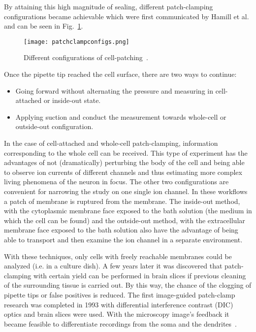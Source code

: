 \documentclass[12pt,a4paper]{report}
\begin{document}
By attaining this high magnitude of sealing, different patch-clamping configurations became achievable which were first communicated by Hamill et al. and can be seen in Fig.~\ref{fig:pcconfigs}.
\begin{figure}
    \centering
    \texttt{[image: patchclampconfigs.png]}
    \caption{Different configurations of cell-patching~\cite{hamill1981}.}
    \label{fig:pcconfigs}
\end{figure}
Once the pipette tip reached the cell surface, there are two ways to continue:
\begin{itemize}
    \item Going forward without alternating the pressure and measuring in cell-attached or inside-out state.
    \item Applying suction and conduct the measurement towards whole-cell or outside-out configuration.
\end{itemize}
In the case of cell-attached and whole-cell patch-clamping, information corresponding to the whole cell can be received. This type of experiment has the advantages of not (dramatically) perturbing the body of the cell and being able to observe ion currents of different channels and thus estimating more complex living phenomena of the neuron in focus. The other two configurations are convenient for narrowing the study on one single ion channel. In these workflows a patch of membrane is ruptured from the membrane. The inside-out method, with the cytoplasmic membrane face exposed to the bath solution (the medium in which the cell can be found) and the outside-out method, with the extracellular membrane face exposed to the bath solution also have the advantage of being able to transport and then examine the ion channel in a separate environment.\par
With these techniques, only cells with freely reachable membranes could be analyzed (i.e. in a culture dish). A few years later it was discovered that patch-clamping with certain yield can be performed in brain slices if previous cleaning of the surrounding tissue is carried out. By this way, the chance of the clogging of pipette tips or false positives is reduced. The first image-guided patch-clamp research was completed in 1993 with differential interference contrast (DIC) optics and brain slices were used. With the microscopy image's feedback it became feasible to differentiate recordings from the soma and the dendrites~\cite{stuart1993}.\par
\end{document}
